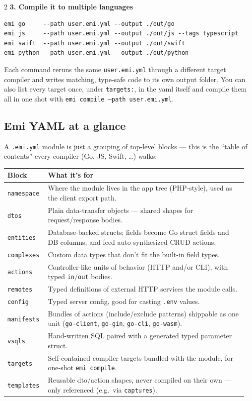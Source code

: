 \documentclass[10pt,a4paper]{extarticle}
\begin{document}
\begin{multicols}{2}
\columnbreak
\textbf{3. Compile it to multiple languages}
\begin{lstlisting}
emi go     --path user.emi.yml --output ./out/go
emi js     --path user.emi.yml --output ./out/js --tags typescript
emi swift  --path user.emi.yml --output ./out/swift
emi python --path user.emi.yml --output ./out/python
\end{lstlisting}

Each command reruns the same \texttt{user.emi.yml} through a different
target compiler and writes matching, type-safe code to its own output
folder. You can also list every target once, under \texttt{targets:}, in
the yaml itself and compile them all in one shot with
\texttt{emi compile --path user.emi.yml}.

\subsection*{Emi YAML at a glance}

A \texttt{.emi.yml} module is just a grouping of top-level blocks --- this
is the ``table of contents'' every compiler (Go, JS, Swift, \ldots) walks:
\end{multicols}

{\small
\begin{tabular}{@{}p{0.16\linewidth}p{0.8\linewidth}@{}}
\toprule
\textbf{Block} & \textbf{What it's for} \\
\midrule
\texttt{namespace} & Where the module lives in the app tree (PHP-style), used as the client export path. \\
\texttt{dtos} & Plain data-transfer objects --- shared shapes for request/response bodies. \\
\texttt{entities} & Database-backed structs; fields become Go struct fields and DB columns, and feed auto-synthesized CRUD actions. \\
\texttt{complexes} & Custom data types that don't fit the built-in field types. \\
\texttt{actions} & Controller-like units of behavior (HTTP and/or CLI), with typed \texttt{in}/\texttt{out} bodies. \\
\texttt{remotes} & Typed definitions of external HTTP services the module calls. \\
\texttt{config} & Typed server config, good for casting \texttt{.env} values. \\
\texttt{manifests} & Bundles of actions (include/exclude patterns) shippable as one unit (\texttt{go-client}, \texttt{go-gin}, \texttt{go-cli}, \texttt{go-wasm}). \\
\texttt{vsqls} & Hand-written SQL paired with a generated typed parameter struct. \\
\texttt{targets} & Self-contained compiler targets bundled with the module, for one-shot \texttt{emi compile}. \\
\texttt{templates} & Reusable dto/action shapes, never compiled on their own --- only referenced (e.g.\ via \texttt{captures}). \\
\bottomrule
\end{tabular}
}
\end{document}
